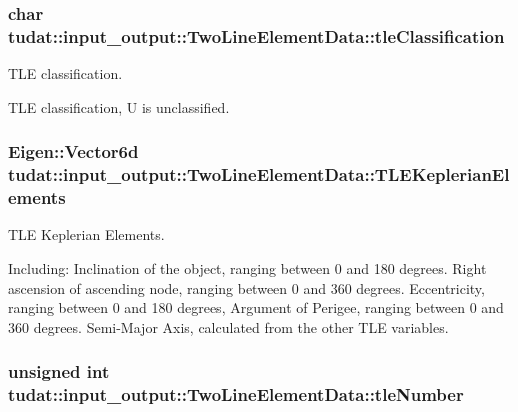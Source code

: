 \subsubsection[{\texorpdfstring{tle\+Classification}{tleClassification}}]{\setlength{\rightskip}{0pt plus 5cm}char tudat\+::input\+\_\+output\+::\+Two\+Line\+Element\+Data\+::tle\+Classification}\hypertarget{structtudat_1_1input__output_1_1TwoLineElementData_a1109413866a443f71435c06e36f8f931}{}\label{structtudat_1_1input__output_1_1TwoLineElementData_a1109413866a443f71435c06e36f8f931}


T\+LE classification. 

T\+LE classification, U is unclassified. 
\subsubsection[{\texorpdfstring{T\+L\+E\+Keplerian\+Elements}{TLEKeplerianElements}}]{\setlength{\rightskip}{0pt plus 5cm}Eigen\+::\+Vector6d tudat\+::input\+\_\+output\+::\+Two\+Line\+Element\+Data\+::\+T\+L\+E\+Keplerian\+Elements}\hypertarget{structtudat_1_1input__output_1_1TwoLineElementData_a5bc3d2b995371b44505617256d43c5d9}{}\label{structtudat_1_1input__output_1_1TwoLineElementData_a5bc3d2b995371b44505617256d43c5d9}


T\+LE Keplerian Elements. 

Including\+: Inclination of the object, ranging between 0 and 180 degrees. Right ascension of ascending node, ranging between 0 and 360 degrees. Eccentricity, ranging between 0 and 180 degrees, Argument of Perigee, ranging between 0 and 360 degrees. Semi-\/\+Major Axis, calculated from the other T\+LE variables. 
\subsubsection[{\texorpdfstring{tle\+Number}{tleNumber}}]{\setlength{\rightskip}{0pt plus 5cm}unsigned int tudat\+::input\+\_\+output\+::\+Two\+Line\+Element\+Data\+::tle\+Number}\hypertarget{structtudat_1_1input__output_1_1TwoLineElementData_a1adac809c7a8d18356259a39905f04fc}{}\label{structtudat_1_1input__output_1_1TwoLineElementData_a1adac809c7a8d18356259a39905f04fc}


